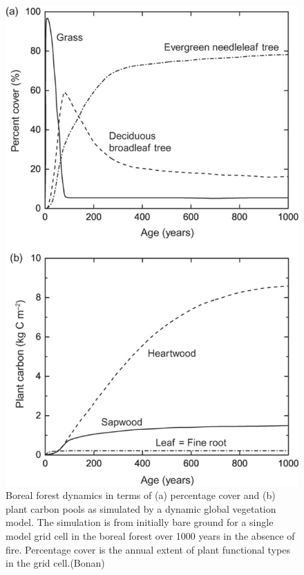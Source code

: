 \documentclass[
  12pt,
  oneside]{book}
\begin{document}
\begin{figure}

{\centering \includegraphics[width=0.8\linewidth]{figures/chap6/f67_DGM_boreal_succession} 

}

\caption{Boreal forest dynamics in terms of (a) percentage cover and (b) plant carbon pools as simulated by a dynamic global vegetation model. The simulation is from initially bare ground for a single model grid cell in the boreal forest over 1000 years in the absence of fire. Percentage cover is the annual extent of plant functional types in the grid cell.(Bonan)}\label{fig:f67}
\end{figure}
\end{document}
